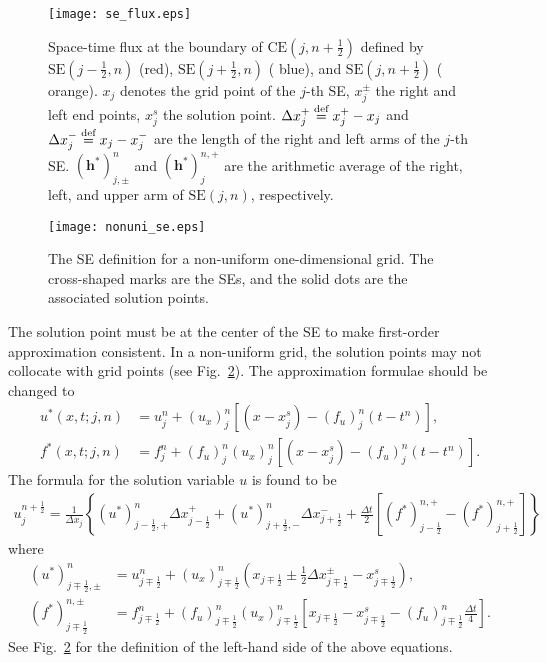 \documentclass{turgon}
\begin{document}
\begin{figure}[hbtp]
  \centering
  \texttt{[image: se\_flux.eps]}
  \caption{Space-time flux at the boundary of $\mathrm{CE}(j, n+\frac{1}{2})$
  defined by $\mathrm{SE}(j-\frac{1}{2}, n)$ ({\color{red}red}),
  $\mathrm{SE}(j+\frac{1}{2}, n)$ ({\color{blue} blue}), and $\mathrm{SE}(j,
  n+\frac{1}{2})$ ({\color{orange} orange}).  $x_j$ denotes the grid point of
  the $j$-th SE, $x_j^{\pm}$ the right and left end points, $x_j^s$ the
  solution point.  $\Delta x_j^+ \defeq x_j^+ - x_j$ and $\Delta x_j^- \defeq
  x_j - x_j^-$ are the length of the right and left arms of the $j$-th SE.
  $(\mathbf{h^*})_{j,\pm}^n$ and $(\mathbf{h^*})_{j}^{n,+}$ are the arithmetic
  average of the right, left, and upper arm of $\mathrm{SE}(j,n)$,
  respectively.}
  \label{f:se_flux}
\end{figure}

\begin{figure}[hbtp]
  \centering
  \texttt{[image: nonuni\_se.eps]}
  \caption{The SE definition for a non-uniform one-dimensional grid.  The
  cross-shaped marks are the SEs, and the solid dots are the associated
  solution points.}
  \label{f:nonuni_se}
\end{figure}

The solution point must be at the center of the SE to make first-order
approximation consistent.  In a non-uniform grid, the solution points may not
collocate with grid points (see Fig.~\ref{f:nonuni_se}).  The approximation
formulae should be changed to
\begin{align*}
  u^*(x,t;j,n) &= u_j^n + (u_x)_j^n \left[
    (x-x_j^s) - (f_u)_j^n(t-t^n)
  \right] , \\
  f^*(x,t;j,n) &= f_j^n + (f_u)_j^n (u_x)_j^n \left[
    (x-x_j^s) - (f_u)_j^n(t-t^n)
  \right] .
\end{align*}
The formula for the solution variable $u$ is found to be
\begin{align}
  u_j^{n+\frac{1}{2}}
    = \frac{1}{\Delta x_j}\left\{
      (u^*)_{j-\frac{1}{2},+}^n \Delta x_{j-\frac{1}{2}}^+
    + (u^*)_{j+\frac{1}{2},-}^n \Delta x_{j+\frac{1}{2}}^-
    + \frac{\Delta t}{2} \left[
        (f^*)_{j-\frac{1}{2}}^{n,+}
      - (f^*)_{j+\frac{1}{2}}^{n,+}
      \right]
      \right\}
  \label{e:formula:u}
\end{align}
where
\begin{align*}
  (u^*)_{j\mp\frac{1}{2},\pm}^n
   &= u_{j\mp\frac{1}{2}}^n
    + (u_x)_{j\mp\frac{1}{2}}^n
      \left( x_{j\mp\frac{1}{2}}
           \pm \frac{1}{2} \Delta x_{j\mp\frac{1}{2}}^{\pm}
           - x_{j\mp\frac{1}{2}}^s \right), \\
  (f^*)_{j\mp\frac{1}{2}}^{n,\pm}
   &= f_{j\mp\frac{1}{2}}^n
    + (f_u)_{j\mp\frac{1}{2}}^n(u_x)_{j\mp\frac{1}{2}}^n
      \left[x_{j\mp\frac{1}{2}} - x_{j\mp\frac{1}{2}}^s
          - (f_u)_{j\mp\frac{1}{2}}^n \frac{\Delta t}{4}
      \right] .
\end{align*}
See Fig.~\ref{f:nonuni_se} for the definition of the left-hand side of the
above equations.
\end{document}
